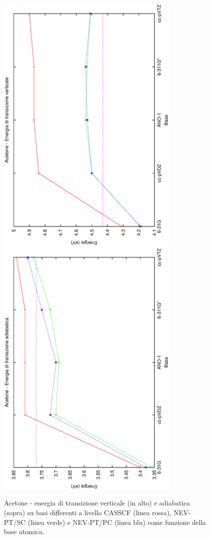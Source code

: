 \begin{figure}[ht]
\begin{center}
\includegraphics[angle=270,width=9cm,keepaspectratio]{immagini/acetone/energie_vert.eps} \\
\includegraphics[angle=270,width=9cm,keepaspectratio]{immagini/acetone/energie_adiab.eps}
\parbox[h]{12cm}{
\caption{\small Acetone - energia di transizione verticale (in alto) e adiabatica (sopra) su basi differenti a livello CASSCF (linea rossa), NEV-PT/SC (linea verde) e NEV-PT/PC (linea blu) come funzione della base atomica.}
\label{fig:acetone_energie_vert_adiab}
}
\end{center}
\end{figure}
